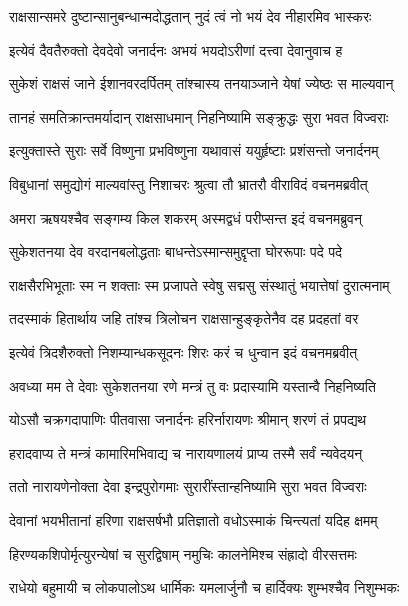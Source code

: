 \twolineshloka
{राक्षसान्समरे दुष्टान्सानुबन्धान्मदोद्धतान्}
{नुदं त्वं नो भयं देव नीहारमिव भास्करः} %

\twolineshloka
{इत्येवं दैवतैरुक्तो देवदेवो जनार्दनः}
{अभयं भयदोऽरीणां दत्त्वा देवानुवाच ह} %

\twolineshloka
{सुकेशं राक्षसं जाने ईशानवरदर्पितम्}
{तांश्चास्य तनयाञ्जाने येषां ज्येष्ठः स माल्यवान्} %

\twolineshloka
{तानहं समतिक्रान्तमर्यादान् राक्षसाधमान्}
{निहनिष्यामि सङ्क्रुद्धः सुरा भवत विज्वराः} %

\twolineshloka
{इत्युक्तास्ते सुराः सर्वे विष्णुना प्रभविष्णुना}
{यथावासं ययुर्हृष्टाः प्रशंसन्तो जनार्दनम्} %

\twolineshloka
{विबुधानां समुद्योगं माल्यवांस्तु निशाचरः}
{श्रुत्वा तौ भ्रातरौ वीराविदं वचनमब्रवीत्} %

\twolineshloka
{अमरा ऋषयश्चैव सङ्गम्य किल शकरम्}
{अस्मद्वधं परीप्सन्त इदं वचनमब्रुवन्} %

\twolineshloka
{सुकेशतनया देव वरदानबलोद्धताः}
{बाधन्तेऽस्मान्समुद्दृप्ता घोररूपाः पदे पदे} %

\twolineshloka
{राक्षसैरभिभूताः स्म न शक्ताः स्म प्रजापते}
{स्वेषु सद्मसु संस्थातुं भयात्तेषां दुरात्मनाम्} %

\twolineshloka
{तदस्माकं हितार्थाय जहि तांश्च त्रिलोचन}
{राक्षसान्हुङ्कृतेनैव दह प्रदहतां वर} %

\twolineshloka
{इत्येवं त्रिदशैरुक्तो निशम्यान्धकसूदनः}
{शिरः करं च धुन्वान इदं वचनमब्रवीत्} %

\twolineshloka
{अवध्या मम ते देवाः सुकेशतनया रणे}
{मन्त्रं तु वः प्रदास्यामि यस्तान्वै निहनिष्यति} %

\twolineshloka
{योऽसौ चक्रगदापाणिः पीतवासा जनार्दनः}
{हरिर्नारायणः श्रीमान् शरणं तं प्रपद्यथ} %

\twolineshloka
{हरादवाप्य ते मन्त्रं कामारिमभिवाद्य च}
{नारायणालयं प्राप्य तस्मै सर्वं न्यवेदयन्} %

\twolineshloka
{ततो नारायणेनोक्ता देवा इन्द्रपुरोगमाः}
{सुरारींस्तान्हनिष्यामि सुरा भवत विज्वराः} %

\twolineshloka
{देवानां भयभीतानां हरिणा राक्षसर्षभौ}
{प्रतिज्ञातो वधोऽस्माकं चिन्त्यतां यदिह क्षमम्} %

\twolineshloka
{हिरण्यकशिपोर्मृत्युरन्येषां च सुरद्विषाम्}
{नमुचिः कालनेमिश्च संह्रादो वीरसत्तमः} %

\twolineshloka
{राधेयो बहुमायी च लोकपालोऽथ धार्मिकः}
{यमलार्जुनौ च हार्दिक्यः शुम्भश्चैव निशुम्भकः} %

